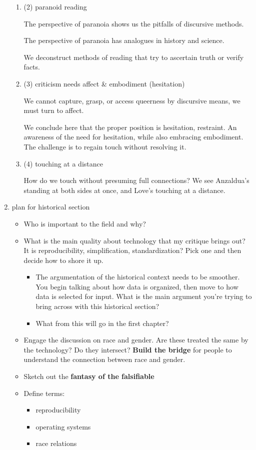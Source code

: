 \documentclass[11pt]{article}
\begin{document}
\begin{enumerate}
\begin{enumerate}
\item (2) paranoid reading
\label{sec:org98d4bb9}

The perspective of paranoia shows us the pitfalls of discursive
methods.      

The perspective of paranoia has analogues in history and science.

We deconstruct methods of reading that try to ascertain truth or
verify facts.

\item (3) criticism needs affect \& embodiment (hesitation)
\label{sec:orge900cc5}

We cannot capture, grasp, or access queerness by discursive means, we
must turn to affect.

We conclude here that the proper position is hesitation, restraint. An
awareness of the need for hesitation, while also embracing
embodiment. The challenge is to regain touch without resolving it.

\item (4) touching at a distance
\label{sec:org5eda2bf}

How do we touch without presuming full connections? We see Anzaldua's
standing at both sides at once, and Love's touching at a distance.
\end{enumerate}

\item plan for historical section
\label{sec:org76715c9}

\begin{itemize}
\item Who is important to the field and why?

\item What is the main quality about technology that my critique brings
out? It is reproducibility, simplification, standardization? Pick
one and then decide how to shore it up. 
\begin{itemize}
\item The argumentation of the historical context needs to be
smoother. You begin talking about how data is organized, then
move to how data is selected for input. What is the main
argument you're trying to bring across with this historical
section?
\item What from this will go in the first chapter?
\end{itemize}
\item Engage the discussion on race and gender. Are these treated the
same by the technology? Do they intersect? \textbf{Build the bridge} for
people to understand the connection between race and gender.
\item Sketch out the \textbf{fantasy of the falsifiable}
\item Define terms:
\begin{itemize}
\item reproducibility
\item operating systems
\item race relations
\end{itemize}
\end{itemize}


\end{enumerate}
\end{document}
